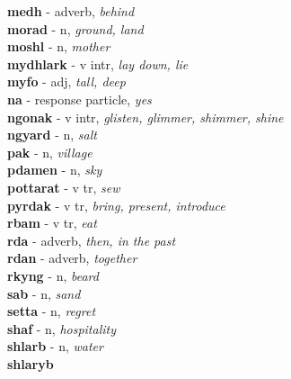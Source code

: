 \vspace{7pt}\textbf{medh}   - adverb, \emph{behind}\\ \vspace{7pt}\textbf{morad}   - n, \emph{ground, land}\\ \vspace{7pt}\textbf{moshl}   - n, \emph{mother}\\ \vspace{7pt}\textbf{mydhlark}   - v intr, \emph{lay down, lie}\\ \vspace{7pt}\textbf{myfo}   - adj, \emph{tall, deep}\\ \vspace{7pt}\textbf{na}   - response particle, \emph{yes}\\ \vspace{7pt}\textbf{ngonak}   - v intr, \emph{glisten, glimmer, shimmer, shine}\\ \vspace{7pt}\textbf{ngyard}   - n, \emph{salt}\\ \vspace{7pt}\textbf{pak}   - n, \emph{village}\\ \vspace{7pt}\textbf{pdamen}   - n, \emph{sky}\\ \vspace{7pt}\textbf{pottarat}   - v tr, \emph{sew}\\ \vspace{7pt}\textbf{pyrdak}   - v tr, \emph{bring, present, introduce}\\ \vspace{7pt}\textbf{rbam}   - v tr, \emph{eat}\\ \vspace{7pt}\textbf{rda}   - adverb, \emph{then, in the past}\\ \vspace{7pt}\textbf{rdan}   - adverb, \emph{together}\\ \vspace{7pt}\textbf{rkyng}   - n, \emph{beard}\\ \vspace{7pt}\textbf{sab}   - n, \emph{sand}\\ \vspace{7pt}\textbf{setta}   - n, \emph{regret}\\ \vspace{7pt}\textbf{shaf}   - n, \emph{hospitality}\\ \vspace{7pt}\textbf{shlarb}   - n, \emph{water}\\ \vspace{7pt}\textbf{shlaryb} 
